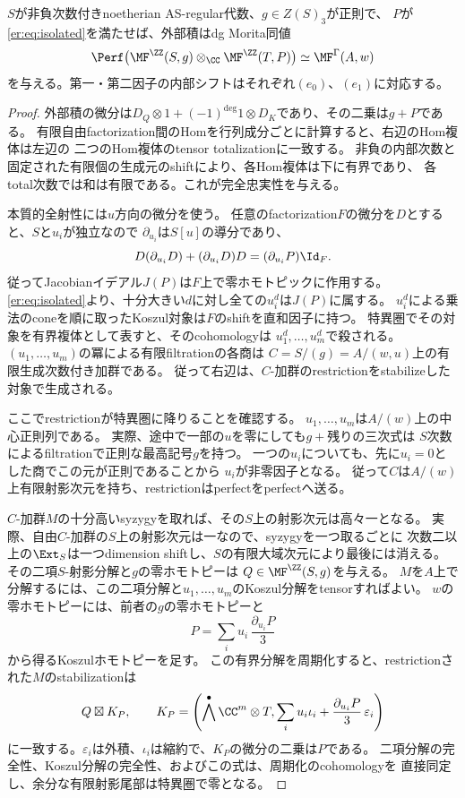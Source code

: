 \begin{lemma}[中心変数に対する外部積生成]\label{er:lem:TS}
$S$が非負次数付きnoetherian AS-regular代数、$g\in Z(S)_3$が正則で、
$P$が\eqref{er:eq:isolated}を満たせば、外部積はdg Morita同値
\begin{equation}\label{er:eq:TS}
 \Perf\bigl(\MF^\ZZ(S,g)\otimes_\CC\MF^\ZZ(T,P)\bigr)
 \simeq\MF^\Gamma(A,w)
\end{equation}
を与える。第一・第二因子の内部シフトはそれぞれ$(e_0)$、$(e_1)$に対応する。
\end{lemma}
\begin{proof}
外部積の微分は$D_Q\otimes1+(-1)^{\deg}1\otimes D_K$であり、その二乗は$g+P$である。
有限自由factorization間のHomを行列成分ごとに計算すると、右辺のHom複体は左辺の
二つのHom複体のtensor totalizationに一致する。
非負の内部次数と固定された有限個の生成元のshiftにより、各Hom複体は下に有界であり、
各total次数では和は有限である。これが完全忠実性を与える。

本質的全射性には$u$方向の微分を使う。
任意のfactorization$F$の微分を$D$とすると、$S$と$u_i$が独立なので
$\partial_{u_i}$は$S[u]$の導分であり、
\[
 D(\partial_{u_i}D)+(\partial_{u_i}D)D
   =(\partial_{u_i}P)\Id_F.
\]
従ってJacobianイデアル$J(P)$は$F$上で零ホモトピックに作用する。
\eqref{er:eq:isolated}より、十分大きい$d$に対し全ての$u_i^d$は$J(P)$に属する。
$u_i^d$による乗法のconeを順に取ったKoszul対象は$F$のshiftを直和因子に持つ。
特異圏でその対象を有界複体として表すと、そのcohomologyは
$u_1^d,\ldots,u_m^d$で殺される。
$(u_1,\ldots,u_m)$の冪による有限filtrationの各商は
$C=S/(g)=A/(w,u)$上の有限生成次数付き加群である。
従って右辺は、$C$-加群のrestrictionをstabilizeした対象で生成される。

ここでrestrictionが特異圏に降りることを確認する。
$u_1,\ldots,u_m$は$A/(w)$上の中心正則列である。
実際、途中で一部の$u$を零にしても$g+$残りの三次式は
$S$次数によるfiltrationで正則な最高記号$g$を持つ。
一つの$u_i$についても、先に$u_i=0$とした商でこの元が正則であることから
$u_i$が非零因子となる。
従って$C$は$A/(w)$上有限射影次元を持ち、restrictionはperfectをperfectへ送る。

$C$-加群$M$の十分高いsyzygyを取れば、その$S$上の射影次元は高々一となる。
実際、自由$C$-加群の$S$上の射影次元は一なので、syzygyを一つ取るごとに
次数二以上の$\Ext_S$は一つdimension shiftし、$S$の有限大域次元により最後には消える。
その二項$S$-射影分解と$g$の零ホモトピーは
$Q\in\MF^\ZZ(S,g)$を与える。
$M$を$A$上で分解するには、この二項分解と$u_1,\ldots,u_m$のKoszul分解をtensorすればよい。
$w$の零ホモトピーには、前者の$g$の零ホモトピーと
\[
 P=\sum_i u_i\,\frac{\partial_{u_i}P}{3}
\]
から得るKoszulホモトピーを足す。
この有界分解を周期化すると、restrictionされた$M$のstabilizationは
\[
 Q\boxtimes K_P,\qquad
 K_P=\left(\bigwedge^\bullet\CC^m\otimes T,
       \sum_i u_i\iota_i+\frac{\partial_{u_i}P}{3}\,\varepsilon_i\right)
\]
に一致する。$\varepsilon_i$は外積、$\iota_i$は縮約で、$K_P$の微分の二乗は$P$である。
二項分解の完全性、Koszul分解の完全性、およびこの式は、周期化のcohomologyを
直接同定し、余分な有限射影尾部は特異圏で零となる。


\end{proof}
